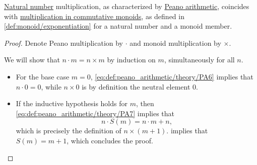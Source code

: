 \begin{lemma}\label{thm:natural_number_multiplication_and_monoid_exponentiation}
  \hyperref[def:natural_numbers]{Natural number} multiplication, as characterized by \hyperref[def:peano_arithmetic]{Peano arithmetic}, coincides with \hyperref[def:additive_semigroup/iterated]{multiplication in commutative monoids}, as defined in \cref{def:monoid/exponentiation} for a natural number and a monoid member.
\end{lemma}
\begin{proof}
  Denote Peano multiplication by \( \cdot \) and monoid multiplication by \( \times \).

  We will show that \( n \cdot m = n \times m \) by induction on \( m \), simultaneously for all \( n \).
  \begin{itemize}
    \item For the base case \( m = 0 \), \eqref{eq:def:peano_arithmetic/theory/PA6} implies that \( n \cdot 0 = 0 \), while \( n \times 0 \) is by definition the neutral element \( 0 \).

    \item If the inductive hypothesis holds for \( m \), then \eqref{eq:def:peano_arithmetic/theory/PA7} implies that
    \begin{equation*}
      n \cdot S(m) = n \cdot m + n,
    \end{equation*}
    which is precisely the definition of \( n \times (m + 1) \).  implies that \( S(m) = m + 1 \), which concludes the proof.
  \end{itemize}
\end{proof}

